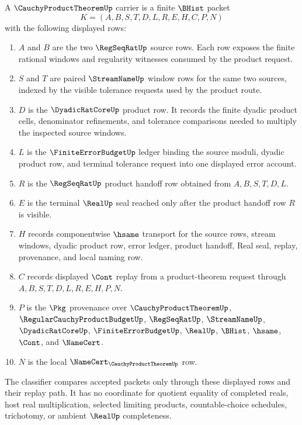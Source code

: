 \begin{definition}
\label{def:cauchy-product-theorem-carrier}
A $\CauchyProductTheoremUp$ carrier is a finite $\BHist$ packet
$$
K=(A,B,S,T,D,L,R,E,H,C,P,N)
$$
with the following displayed rows:
\begin{enumerate}
\item $A$ and $B$ are the two $\RegSeqRatUp$ source rows. Each row exposes the finite rational windows and regularity witnesses consumed by the product request.
\item $S$ and $T$ are paired $\StreamNameUp$ window rows for the same two sources, indexed by the visible tolerance requests used by the product route.
\item $D$ is the $\DyadicRatCoreUp$ product row. It records the finite dyadic product cells, denominator refinements, and tolerance comparisons needed to multiply the inspected source windows.
\item $L$ is the $\FiniteErrorBudgetUp$ ledger binding the source moduli, dyadic product row, and terminal tolerance request into one displayed error account.
\item $R$ is the $\RegSeqRatUp$ product handoff row obtained from $A,B,S,T,D,L$.
\item $E$ is the terminal $\RealUp$ seal reached only after the product handoff row $R$ is visible.
\item $H$ records componentwise $\hsame$ transport for the source rows, stream windows, dyadic product row, error ledger, product handoff, Real seal, replay, provenance, and local naming row.
\item $C$ records displayed $\Cont$ replay from a product-theorem request through $A,B,S,T,D,L,R,E,H,P,N$.
\item $P$ is the $\Pkg$ provenance over $\CauchyProductTheoremUp$, $\RegularCauchyProductBudgetUp$, $\RegSeqRatUp$, $\StreamNameUp$, $\DyadicRatCoreUp$, $\FiniteErrorBudgetUp$, $\RealUp$, $\BHist$, $\hsame$, $\Cont$, and $\NameCert$.
\item $N$ is the local $\NameCert_{\CauchyProductTheoremUp}$ row.
\end{enumerate}
The classifier compares accepted packets only through these displayed rows and their replay path. It has no coordinate for quotient equality of completed reals, host real multiplication, selected limiting products, countable-choice schedules, trichotomy, or ambient $\RealUp$ completeness.
\end{definition}


